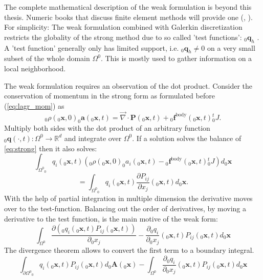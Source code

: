 \documentclass[m,times]{cgMA}
\begin{document}
The complete mathematical description of the weak formulation is beyond this thesis. Numeric books that discuss finite element methods will provide one (\cite{bathe2006finite}, \cite{dahmen2008numerik}). For simplicity: The weak formulation combined with Galerkin discretization restricts the globality of the strong method due to so called 'test functions': $_0\boldsymbol{q}_h$ . A 'test function' generally only has limited support, i.e. $ _0\boldsymbol{q}_h\neq 0$ on a very small subset of the whole domain $\Omega^0$. This is mostly used to gather information on a local neighborhood.

The weak formulation requires an observation of the dot product. Consider the conservation of momentum in the strong form as formulated before (\ref{eq:lagr_mom}) as
\begin{equation}\label{eq:strong}
  _0\rho(_0\boldsymbol{x},0)_0\boldsymbol{a}(_0\boldsymbol{x},t)
  = \vec{\nabla} \cdot \boldsymbol{P}(_0\boldsymbol{x},t) + {_0\boldsymbol{f}} ^ {\text{body}}(_0\boldsymbol{x},t) {^t_0J}.
\end{equation}
Multiply both sides with the dot product of an arbitrary function $_0\boldsymbol{q}(\cdot,t):\Omega^0 \rightarrow \mathbb{R}^d$ and integrate over $\Omega^0$. If a solution solves the balance of \ref{eq:strong} then it also solves:
$$
\int _ { \Omega ^ { 0 } } _0q _ { i } ( _0\boldsymbol { x } , t ) \left(_0\rho (_0\boldsymbol{x} , 0 ) _0a _{ i } (_0\boldsymbol{x} , t ) - {_0\boldsymbol{f}} ^ {\text{body}}(_0\boldsymbol{x},t) {^t_0J}\right) d _0\boldsymbol{x}
$$
\begin{equation}
  =\int _ { \Omega ^ { 0 } } _0q _ { i } ( _0\boldsymbol { x } , t ) \frac{\partial P _ {ij}}{\partial x_j} ( _0\boldsymbol{x} , t ) d_0\boldsymbol{x}.
\end{equation}
With the help of partial integration in multiple dimension the derivative moves over to the test-function. Balancing out the order of derivatives, by moving a derivative to the test function, is the main motive of the weak form:
$$
\int _ { \Omega ^ { 0 } } \frac{\partial (_0q _ { i } ( _0\boldsymbol { x } , t ) P _ {ij} ( _0\boldsymbol{x} , t ))}{\partial _0x_j}
- \frac{\partial _0q _ { i }}{\partial _0x_j} ( _0\boldsymbol { x } , t ) P _ {ij}( _0\boldsymbol{x} , t )
d_0\boldsymbol{x}
$$
The divergence theorem allows to convert the first term to a boundary integral.
\begin{equation}
  \int _ { \partial \Omega ^ { 0 } } _0q _ { i } ( _0\boldsymbol { x } , t ) P _ {ij} ( _0\boldsymbol{x} , t)
  d_0\boldsymbol{A}(_0\boldsymbol{x})
  -\int _ { \Omega ^ { 0 } }  \frac{\partial _0q _ { i }}{\partial _0x_j} ( _0\boldsymbol { x } , t ) P _ {ij}( _0\boldsymbol{x} , t )
  d_0\boldsymbol{x}
\end{equation}
\end{document}
